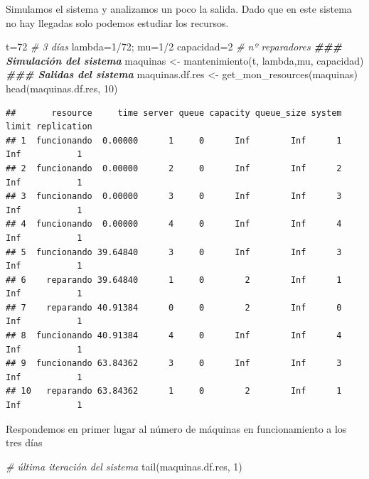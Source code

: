 \documentclass[
]{book}
\newenvironment{Shaded}{\begin{snugshade}}{\end{snugshade}}
\newcommand{\CommentTok}[1]{\textcolor[rgb]{0.56,0.35,0.01}{\textit{#1}}}
\newcommand{\DecValTok}[1]{\textcolor[rgb]{0.00,0.00,0.81}{#1}}
\newcommand{\DocumentationTok}[1]{\textcolor[rgb]{0.56,0.35,0.01}{\textbf{\textit{#1}}}}
\newcommand{\FunctionTok}[1]{\textcolor[rgb]{0.00,0.00,0.00}{#1}}
\newcommand{\NormalTok}[1]{#1}
\newcommand{\OtherTok}[1]{\textcolor[rgb]{0.56,0.35,0.01}{#1}}
\newcommand{\SpecialCharTok}[1]{\textcolor[rgb]{0.00,0.00,0.00}{#1}}
\theoremstyle{definition}
\theoremstyle{definition}
\theoremstyle{definition}
\theoremstyle{definition}
\theoremstyle{remark}
\begin{document}
Simulamos el sistema y analizamos un poco la salida. Dado que en este sistema no hay llegadas solo podemos estudiar los recursos.

\begin{Shaded}
\begin{Highlighting}[]
\NormalTok{t}\OtherTok{=}\DecValTok{72} \CommentTok{\# 3 días}
\NormalTok{lambda}\OtherTok{=}\DecValTok{1}\SpecialCharTok{/}\DecValTok{72}\NormalTok{; mu}\OtherTok{=}\DecValTok{1}\SpecialCharTok{/}\DecValTok{2}
\NormalTok{capacidad}\OtherTok{=}\DecValTok{2} \CommentTok{\# nº reparadores}
\DocumentationTok{\#\#\# Simulación del sistema}
\NormalTok{maquinas }\OtherTok{\textless{}{-}} \FunctionTok{mantenimiento}\NormalTok{(t, lambda,mu, capacidad)}
\DocumentationTok{\#\#\# Salidas del sistema}
\NormalTok{maquinas.df.res }\OtherTok{\textless{}{-}} \FunctionTok{get\_mon\_resources}\NormalTok{(maquinas)}
\FunctionTok{head}\NormalTok{(maquinas.df.res, }\DecValTok{10}\NormalTok{)}
\end{Highlighting}
\end{Shaded}

\begin{verbatim}
##       resource     time server queue capacity queue_size system limit replication
## 1  funcionando  0.00000      1     0      Inf        Inf      1   Inf           1
## 2  funcionando  0.00000      2     0      Inf        Inf      2   Inf           1
## 3  funcionando  0.00000      3     0      Inf        Inf      3   Inf           1
## 4  funcionando  0.00000      4     0      Inf        Inf      4   Inf           1
## 5  funcionando 39.64840      3     0      Inf        Inf      3   Inf           1
## 6    reparando 39.64840      1     0        2        Inf      1   Inf           1
## 7    reparando 40.91384      0     0        2        Inf      0   Inf           1
## 8  funcionando 40.91384      4     0      Inf        Inf      4   Inf           1
## 9  funcionando 63.84362      3     0      Inf        Inf      3   Inf           1
## 10   reparando 63.84362      1     0        2        Inf      1   Inf           1
\end{verbatim}

Respondemos en primer lugar al número de máquinas en funcionamiento a los tres días

\begin{Shaded}
\begin{Highlighting}[]
\CommentTok{\# última iteración del sistema}
\FunctionTok{tail}\NormalTok{(maquinas.df.res, }\DecValTok{1}\NormalTok{)}
\end{Highlighting}
\end{Shaded}
\end{document}
